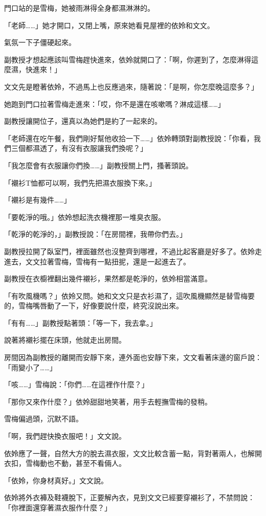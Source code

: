 門口站的是雪梅，她被雨淋得全身都濕淋淋的。

「老師……」她才開口，又閉上嘴，原來她看見屋裡的依姈和文文。

氣氛一下子僵硬起來。

副教授才想起應該叫雪梅趕快進來，依姈就開口了：「啊，你遲到了，怎麼淋得這麼濕，快進來！」

文文先是瞪著依姈，不過馬上也反應過來，隨著說：「是啊，你怎麼晚這麼多？」

她跑到門口拉著雪梅走進來：「哎，你不是還在咳嗽嗎？淋成這樣……」

副教授讓開位子，還真以為她們是約了一起來的。

「老師還在吃午餐，我們剛好幫他收拾一下……」依姈轉頭對副教授說：「你看，我們三個都濕透了，有沒有衣服讓我們換呢？」

「我怎麼會有衣服讓你們換……」副教授關上門，搔著頭說。

「襯衫T恤都可以啊，我們先把濕衣服換下來。」

「襯衫是有幾件……」

「要乾淨的哦。」依姈想起洗衣機裡那一堆臭衣服。

「乾淨的乾淨的，」副教授說：「在房間裡，我帶你們去。」

副教授拉開了臥室門，裡面雖然也沒整齊到哪裡，不過比起客廳是好多了。依姈走進去，文文拉著雪梅，雪梅有一點扭抳，還是一起進去了。

副教授在衣櫥裡翻出幾件襯衫，果然都是乾淨的，依姈相當滿意。

「有吹風機嗎？」依姈又問。她和文文只是衣衫濕了，這吹風機顯然是替雪梅要的，雪梅嘴唇動了一下，好像要說什麼，終究沒說出來。

「有有……」副教授點著頭：「等一下，我去拿。」

說著將襯衫擺在床頭，他就走出房間。

房間因為副教授的離開而安靜下來，連外面也安靜下來，文文看著床邊的窗戶說：「雨變小了……」

「咳……」雪梅說：「你們……在這裡作什麼？」

「那你又來作什麼？」依姈甜甜地笑著，用手去輕撫雪梅的發稍。

雪梅偏過頭，沉默不語。

「啊，我們趕快換衣服吧！」文文說。

依姈應了一聲，自然大方的脫去濕衣服，文文比較含蓄一點，背對著兩人，也解開衣扣，雪梅動也不動，甚至不看倆人。

「依姈，你身材真好。」文文說。

依姈將外衣褲及鞋襪脫下，正要解內衣，見到文文已經要穿襯衫了，不禁問說：「你裡面還穿著濕衣服作什麼？」

